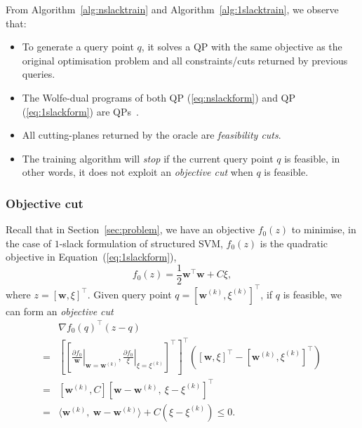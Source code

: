 \documentclass[9pt]{extarticle}
\begin{document}
From Algorithm~\ref{alg:nslacktrain} and Algorithm~\ref{alg:1slacktrain}, we observe that:
\begin{itemize}
\item To generate a query point $q$, it solves a QP with the same objective as the original optimisation problem and
      all constraints/cuts returned by previous queries. 
\item The Wolfe-dual programs of both QP (\ref{eq:nslackform}) and QP (\ref{eq:1slackform}) are QPs~\cite{tsochantaridis2005large,joachims2009cutting}.
\item All cutting-planes returned by the oracle are \emph{feasibility cuts}.
\item The training algorithm will \emph{stop} if the current query point $q$ is feasible, 
      in other words, it does not exploit an \emph{objective cut} when $q$ is feasible. 
\end{itemize}


\subsubsection{Objective cut}
\label{sec:ssvm_objcut}

Recall that in Section~\ref{sec:problem}, we have an objective $f_0(z)$ to minimise, in the case of $1$-slack formulation of structured SVM,
$f_0(z)$ is the quadratic objective in Equation~(\ref{eq:1slackform}), 
\begin{equation}
\label{eq:optobj}
f_0(z) = \frac{1}{2} \mathbf{w}^\top \mathbf{w} + C\xi,
\end{equation}
where $z = [\mathbf{w}, \xi]^\top$.
Given query point $q = \left[ \mathbf{w}^{(k)}, \xi^{(k)} \right]^\top$, if $q$ is feasible, we can form an \emph{objective cut}
\begin{equation}
\label{eq:objcut_1slack}
\begin{aligned}
 & \nabla f_0(q)^\top (z - q) \\
=& \left[ \left[ \left.\frac{\partial f_0}{\mathbf{w}}\right|_{\mathbf{w} = \mathbf{w}^{(k)}}, 
                 \left.\frac{\partial f_0}{\xi}\right|_{\xi = \xi^{(k)}} \right]^\top \right]^\top 
   \left( \left[ \mathbf{w}, \xi \right]^\top - \left[ \mathbf{w}^{(k)}, \xi^{(k)} \right]^\top \right)  \\
=& \left[ \mathbf{w}^{(k)}, C \right] \left[ \mathbf{w} - \mathbf{w}^{(k)},~ \xi - \xi^{(k)} \right]^\top  \\
=& \langle \mathbf{w}^{(k)},~ \mathbf{w} - \mathbf{w}^{(k)} \rangle + C (\xi - \xi^{(k)}) \le 0.
\end{aligned}
\end{equation}
\end{document}
